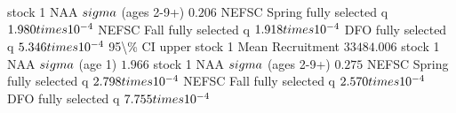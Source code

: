 \documentclass[
]{article}
\begin{document}
stock 1 NAA \(\\sigma\) (ages 2-9+) \(0.206\) NEFSC Spring fully
selected q \(1.980\\times 10^{-4}\) NEFSC Fall fully selected q
\(1.918\\times 10^{-4}\) DFO fully selected q \(5.346\\times 10^{-4}\)
95\textbackslash\% CI upper stock 1 Mean Recruitment \(33484.006\) stock
1 NAA \(\\sigma\) (age 1) \(1.966\) stock 1 NAA \(\\sigma\) (ages 2-9+)
\(0.275\) NEFSC Spring fully selected q \(2.798\\times 10^{-4}\) NEFSC
Fall fully selected q \(2.570\\times 10^{-4}\) DFO fully selected q
\(7.755\\times 10^{-4}\)
\end{document}
